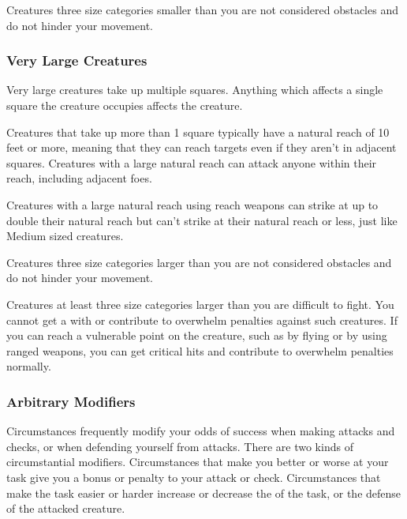              Creatures three size categories smaller than you are not considered obstacles and do not hinder your movement.

        \subsubsection{Very Large Creatures}
             Very large creatures take up multiple squares. Anything which affects a single square the creature occupies affects the creature.

             Creatures that take up more than 1 square typically have a natural reach of 10 feet or more, meaning that they can reach targets even if they aren't in adjacent squares. Creatures with a large natural reach can attack anyone within their reach, including adjacent foes.

            Creatures with a large natural reach using reach weapons can strike at up to double their natural reach but can't strike at their natural reach or less, just like Medium sized creatures.

             Creatures three size categories larger than you are not considered obstacles and do not hinder your movement.

             Creatures at least three size categories larger than you are difficult to fight. You cannot get a  with  or contribute to overwhelm penalties against such creatures. If you can reach a vulnerable point on the creature, such as by flying or by using ranged weapons, you can get critical hits and contribute to overwhelm penalties normally.

        \subsubsection{Arbitrary Modifiers}

            Circumstances frequently modify your odds of success when making attacks and checks, or when defending yourself from attacks.
            There are two kinds of circumstantial modifiers.
            Circumstances that make you better or worse at your task give you a bonus or penalty to your attack or check.
            Circumstances that make the task easier or harder increase or decrease the  of the task, or the defense of the attacked creature.

